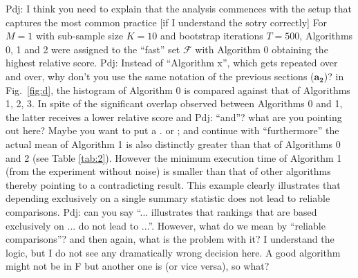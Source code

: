 \documentclass[conference]{IEEEtran}
\newcommand{\p}[1]{{\color{blue} Pdj: #1}}
\begin{document}
\p{I think you need to explain that the analysis commences with the setup that captures the most common practice [if I
  understand the sotry correctly]}
For $M=1$  with sub-sample size $K=10$ and bootstrap iterations $T=500$, Algorithms 0, 1 and 2 were assigned to the
``fast'' set  $\mathcal{F}$ with Algorithm 0 obtaining the highest relative score.
\p{Instead of ``Algorithm x'', which gets repeated over and over, why don't you use the same notation of the previous
  sections ($\mathbf{a_2}$)?}
in Fig.~\ref{fig:d}, the
histogram of Algorithm 0 is compared  against that of Algorithms 1, 2, 3. In spite of the significant overlap observed
between Algorithms 0 and 1, the latter receives a lower relative score and \p{``and''? what are you pointing out here?
  Maybe you want to put a . or ; and continue with ``furthermore''}
the actual mean of Algorithm 1 is also distinctly greater than that of Algorithms 0 and 2 (see Table
\ref{tab:2}). However the minimum execution time of Algorithm 1 (from the experiment without noise) is smaller than that
of other algorithms thereby pointing to a contradicting result. This example clearly illustrates that depending
exclusively on a single summary statistic does not lead to reliable comparisons.
\p{can you say ``... illustrates that rankings that are based exclusively on ... do not lead to ...''. However, what do
  we mean by ``reliable comparisons''? and then again, what is the problem with it? I understand the logic, but I do not
  see any dramatically wrong decision here. A good algorithm might not be in F but another one is (or vice versa), so what?}
\end{document}
